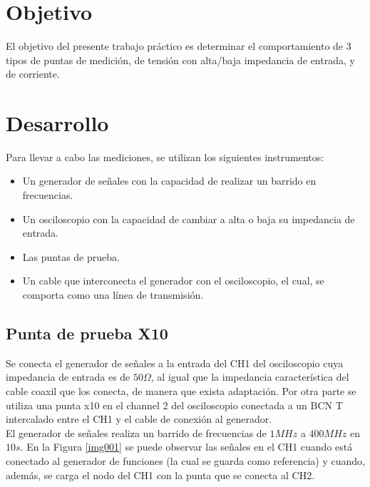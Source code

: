 \documentclass[a4paper,10pt]{article}
\title{  }
\begin{document}
	\maketitle %
	\newpage

	\tableofcontents %
	\newpage


	\section{Objetivo}
	
	\indent	El objetivo del presente trabajo práctico es determinar el 
	comportamiento de 3 tipos de puntas de medición, de tensión 
	con alta/baja impedancia de entrada, y de corriente.
	
	\newpage
	\section{Desarrollo}
		\indent Para llevar a cabo las mediciones, se utilizan los siguientes
		instrumentos:
		\begin{itemize}
			\item Un generador de señales con la capacidad de realizar un 
			barrido en frecuencias.
			\item Un osciloscopio con la capacidad de cambiar a alta o baja su
			impedancia de entrada.
			\item Las puntas de prueba.
			\item Un cable que interconecta el generador con el osciloscopio,
			el cual, se comporta como una línea de transmisión.
		\end{itemize}
				 
		\subsection{Punta de prueba X10}
		\indent Se conecta el generador de se\~nales a la entrada del CH1 del
		osciloscopio cuya impedancia de entrada es de $50 \Omega$, al igual 
		que la impedancia caracter\'istica del cable coaxil que los conecta, 
		de manera que exista adaptaci\'on. Por otra parte se utiliza una punta
		x10 en el channel 2 del osciloscopio conectada a un BCN T intercalado
		entre el CH1 y el cable de conexión al generador. \\
		\indent El generador de se\~nales realiza un barrido de frecuencias de
		$1MHz$ a $400MHz$ en $10s$. En la Figura \ref{img001} se puede 
		observar las se\~nales en el CH1 cuando est\'a conectado al 
		generador de funciones (la cual se guarda como referencia) y cuando, 
		adem\'as, se carga el nodo del CH1 con la punta que se conecta al CH2.
		
\end{document}

